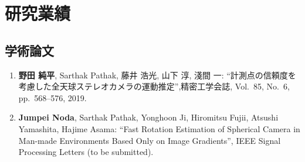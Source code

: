 \chapter*{研究業績}
\thispagestyle{empty}
\lhead[研究業績]{}
\label{achive}

\newpage
\section*{学術論文}
\mbox{}
\begin{enumerate}
\item
\textbf{野田 純平}, Sarthak Pathak, 藤井 浩光, 山下 淳, 淺間 一: ``計測点の信頼度を考慮した全天球ステレオカメラの運動推定”,精密工学会誌, Vol.~85, No.~6, pp.~568--576, 2019.
\\
\item
\textbf{Jumpei Noda}, Sarthak Pathak, Yonghoon Ji, Hiromitsu Fujii, Atsushi Yamashita, Hajime Asama: ``Fast Rotation Estimation of Spherical Camera in Man-made Environments Based Only on Image Gradients”, IEEE Signal Processing Letters (to be submitted).
\end{enumerate}


